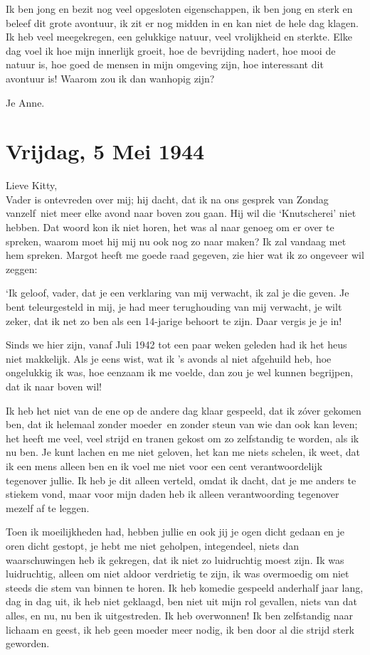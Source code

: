 \documentclass{book}
\begin{document}
Ik ben jong en bezit nog veel opgesloten eigenschappen, ik ben jong en
sterk en beleef dit grote avontuur, ik zit er nog midden in en kan niet
de hele dag klagen. Ik heb veel meegekregen, een gelukkige natuur, veel
vrolijkheid en sterkte. Elke dag voel ik hoe mijn innerlijk groeit, hoe
de bevrijding nadert, hoe mooi de natuur is, hoe goed de mensen in mijn
omgeving zijn, hoe interessant dit avontuur is! Waarom zou ik dan
wanhopig zijn?

Je Anne.

\chapter{Vrijdag, 5 Mei 1944}

Lieve Kitty,\\Vader is ontevreden over mij; hij dacht, dat ik na ons
gesprek van Zondag vanzelf~niet meer elke avond naar boven zou gaan. Hij
wil die `Knutscherei' niet hebben. Dat woord kon ik niet horen, het was
al naar genoeg om er over te spreken, waarom moet hij mij nu ook nog zo
naar maken? Ik zal vandaag met hem spreken. Margot heeft me goede raad
gegeven, zie hier wat ik zo ongeveer wil zeggen:

`Ik geloof, vader, dat je een verklaring van mij verwacht, ik zal je die
geven. Je bent teleurgesteld in mij, je had meer terughouding van mij
verwacht, je wilt zeker, dat ik net zo ben als een 14-jarige behoort te
zijn. Daar vergis je je in!

Sinds we hier zijn, vanaf Juli 1942 tot een paar weken geleden had ik
het heus niet makkelijk. Als je eens wist, wat ik 's avonds al niet
afgehuild heb, hoe ongelukkig ik was, hoe eenzaam ik me voelde, dan zou
je wel kunnen begrijpen, dat ik naar boven wil!

Ik heb het niet van de ene op de andere dag klaar gespeeld, dat ik zóver
gekomen ben, dat ik helemaal zonder moeder~en zonder steun van wie dan
ook kan leven; het heeft me veel, veel strijd en tranen gekost om zo
zelfstandig te worden, als ik nu ben. Je kunt lachen en me niet geloven,
het kan me niets schelen, ik weet, dat ik een mens alleen ben en ik voel
me niet voor een cent verantwoordelijk tegenover jullie. Ik heb je dit
alleen verteld, omdat ik dacht, dat je me anders te stiekem vond, maar
voor mijn daden heb ik alleen verantwoording tegenover mezelf af te
leggen.

Toen ik moeilijkheden had, hebben jullie en ook jij je ogen dicht gedaan
en je oren dicht gestopt, je hebt me niet geholpen, integendeel, niets
dan waarschuwingen heb ik gekregen, dat ik niet zo luidruchtig moest
zijn. Ik was luidruchtig, alleen om niet aldoor verdrietig te zijn, ik
was overmoedig om niet steeds die stem van binnen te horen. Ik heb
komedie gespeeld anderhalf jaar lang, dag in dag uit, ik heb niet
geklaagd, ben niet uit mijn rol gevallen, niets van dat alles, en nu, nu
ben ik uitgestreden. Ik heb overwonnen! Ik ben zelfstandig naar lichaam
en geest, ik heb geen moeder meer nodig, ik ben door al die strijd sterk
geworden.
\end{document}
